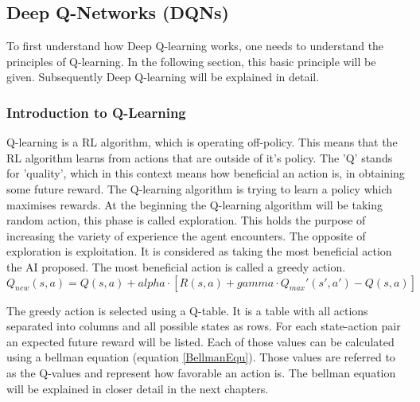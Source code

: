 \documentclass[12pt]{article}
\def\alpha{alpha}%
\def\gamma{gamma}%
\begin{document}
\subsection{Deep Q-Networks (DQNs)}
To first understand how \gls{Deep Q-learning} works, one needs to understand the principles of \gls{Q-learning}. In the following section, this basic principle will be given. Subsequently \gls{Deep Q-learning} will be explained in detail.
\subsubsection{Introduction to Q-Learning}
\gls{Q-learning} is a RL algorithm, which is operating \gls{off-policy}. This means that the RL algorithm learns from actions that are outside of it's \gls{policy}. The 'Q' stands for 'quality', which in this context means how beneficial an action is, in obtaining some future \gls{reward}. The \gls{Q-learning} algorithm is trying to learn a \gls{policy} which maximises \glspl{reward}. At the beginning the \gls{Q-learning} algorithm will be taking random action, this phase is called \gls{exploration}. This holds the purpose of increasing the variety of \gls{experience} the agent encounters. The opposite of \gls{exploration} is \gls{exploitation}. It is considered as taking the most beneficial action the AI proposed. The most beneficial action is called a \gls{greedy action}. \cite{rl_q-learning} \\
\begin{equation}
Q_{new}(s,a) = Q(s, a) + \alpha \cdot [R(s, a) + \gamma \cdot Q_{max}'(s', a') - Q(s, a)]
\label{BellmanEqu}
\end{equation}

The \gls{greedy action} is selected using a \gls{Q-table}. It is a table with all actions separated into columns and all possible \glspl{state} as rows. For each state-action pair an expected future \gls{reward} will be listed. Each of those values can be calculated using a bellman equation (equation \ref{BellmanEqu}). Those values are referred to as the \glspl{Q-value} and represent how favorable an action is. The bellman equation will be explained in closer detail in the next chapters. \cite{rl_q-table} 
\end{document}
